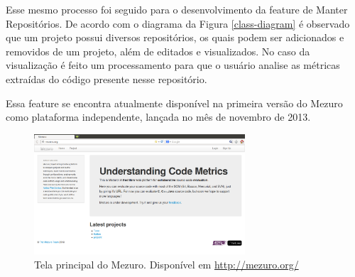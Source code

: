 Esse mesmo processo foi seguido para o desenvolvimento da feature de Manter Repositórios. De acordo com o diagrama da Figura \ref{class-diagram} é observado que um projeto possui diversos repositórios, os quais podem ser adicionados e removidos de um projeto, além de editados e visualizados. No caso da visualização é feito um processamento para que o usuário analise as métricas extraídas do código presente nesse repositório. 

Essa feature se encontra atualmente disponível na primeira versão do Mezuro como plataforma independente, lançada no mês de novembro de 2013.

\graphicspath{{figuras/}}
\begin{figure}[H]
\centering
\includegraphics[width=0.7\textwidth]{mezuro-standalone}
\caption{Tela principal do Mezuro. Disponível em \url{http://mezuro.org/}}
\label{mezuro}
\end{figure}




